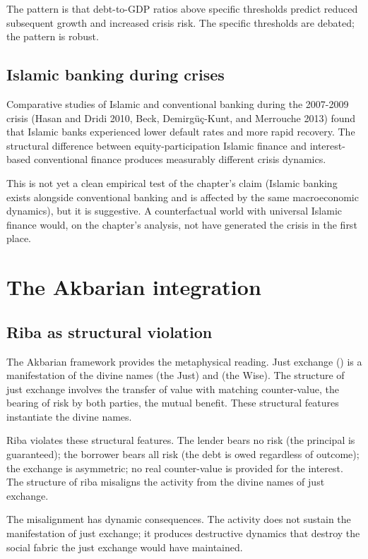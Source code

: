 The pattern is that debt-to-GDP ratios above specific thresholds
predict reduced subsequent growth and increased crisis risk. The
specific thresholds are debated; the pattern is robust.

\subsection{Islamic banking during crises}

Comparative studies of Islamic and conventional banking during the
2007-2009 crisis (Hasan and Dridi 2010, Beck, Demirg\"u\c{c}-Kunt,
and Merrouche 2013) found that Islamic banks experienced lower
default rates and more rapid recovery. The structural difference
between equity-participation Islamic finance and interest-based
conventional finance produces measurably different crisis dynamics.

This is not yet a clean empirical test of the chapter's claim
(Islamic banking exists alongside conventional banking and is
affected by the same macroeconomic dynamics), but it is suggestive.
A counterfactual world with universal Islamic finance would, on
the chapter's analysis, not have generated the crisis in the
first place.

\section{The Akbarian integration}
\label{sec:riba-akbarian}

\subsection{Riba as structural violation}

The Akbarian framework provides the metaphysical reading. Just
exchange () is a manifestation of the divine names
 (the Just) and  (the Wise). The
structure of just exchange involves the transfer of value with
matching counter-value, the bearing of risk by both parties, the
mutual benefit. These structural features instantiate the divine
names.

Riba violates these structural features. The lender bears no risk
(the principal is guaranteed); the borrower bears all risk (the
debt is owed regardless of outcome); the exchange is asymmetric;
no real counter-value is provided for the interest. The structure
of riba misaligns the activity from the divine names of just
exchange.

The misalignment has dynamic consequences. The activity does not
sustain the manifestation of just exchange; it produces destructive
dynamics that destroy the social fabric the just exchange would
have maintained.

